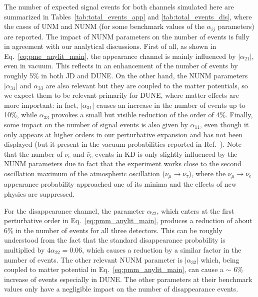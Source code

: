 \documentclass[11pt,a4paper]{article}
\begin{document}
The number of expected signal events for both channels simulated here are summarized in Tables~\ref{tab:total_events_app} and \ref{tab:total_events_dis}, where the cases of UNM and NUNM (for some benchmark values of the $\alpha_{ij}$ parameters) are reported.
The impact of NUNM parameters on the number of events is fully in agreement with our analytical discussions. First of all, as shown in Eq.~\ref{eq:pme_anylit_main}, the appearance channel is mainly influenced by $|\alpha_{21}|$, even in vacuum. This reflects in an  enhancement of the number of events by roughly 5\% in both JD and DUNE. 
On the other hand, the NUNM parameters $|\alpha_{31}|$ and $\alpha_{33}$ 
are also relevant but they are coupled to the matter potentials, so we expect them to be relevant primarily for DUNE, where matter effects are more important: in fact, $|\alpha_{31}|$  causes an increase in the number of events up to 10\%, while $\alpha_{33}$ provokes a small but visible reduction of the order of  4\%.
Finally, some impact on the number of signal events is also given by $\alpha_{11}$, even though it only appears at higher orders in our perturbative expansion and has not been displayed (but it present in the vacuum probabilities reported in Ref.~\cite{Escrihuela:2015wra}). 
Note that the number of $\nu_e$ and $\bar{\nu}_e$ events in KD is only slightly influenced by the NUNM parameters due to fact that the experiment works close to the second oscillation maximum of the atmospheric oscillation ($\nu_{\mu}\rightarrow\nu_{\tau}$), where the $\nu_{\mu}\rightarrow\nu_e$ appearance probability approached one of its minima and the effects of new physics are suppressed.

For the disappearance channel, the parameter $\alpha_{22}$, which enters at the first perturbative order in Eq.~\ref{eq:pmm_anylit_main}, produces  a reduction of about 6\% in the number of events for all three detectors. This can be roughly understood from the fact that the standard disappearance  probability is multiplied by $4\alpha_{22}=0.06$, which causes a reduction by a similar factor in the number of events. The other relevant NUNM parameter is $|\alpha_{32}|$ which, being coupled to matter potential in Eq.~\ref{eq:pmm_anylit_main}, can cause a $\sim$ 6\% increase of events especially in DUNE. The other parameters at their benchmark values only have a negligible impact on the number of disappearance events.
\end{document}
